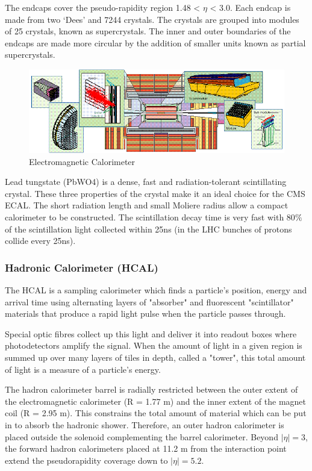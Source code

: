 The endcaps cover the pseudo-rapidity region 1.48 < $\eta$ < 3.0. Each endcap is made from two ‘Dees’ and 7244 crystals. The crystals are grouped into modules of 25 crystals, known as supercrystals. The inner and outer boundaries of the endcaps are made more circular by the addition of smaller units known as partial supercrystals.

\begin{figure}[H]
  \centering
\includegraphics[width=14cm]{CMS_chapter_plots/caloc}
  \caption{Electromagnetic Calorimeter \label{fig:caloc}}
\end{figure}
\noindent
Lead tungstate (PbWO4) is a dense, fast and radiation-tolerant scintillating crystal. These three properties of the crystal make it an ideal choice for the CMS ECAL. The short radiation length and small Moliere radius allow a compact calorimeter to be constructed. The scintillation decay time is very fast with 80$\%$ of the scintillation light collected within 25ns (in the LHC bunches of protons collide every 25ns). 

\subsubsection{Hadronic Calorimeter (HCAL)}

The HCAL \cite{HCAL} is a sampling calorimeter which finds a particle’s position, energy and arrival time using alternating	 layers of "absorber" and fluorescent "scintillator" materials that produce a rapid light pulse when the particle passes through.

Special optic fibres collect up this light and deliver it into readout boxes where photodetectors amplify the signal. When the amount of light in a given region is summed up over many layers of tiles in depth, called a "tower", this total amount of light is a measure of a particle’s energy. 

The hadron calorimeter barrel is radially restricted between the outer extent of the electromagnetic calorimeter (R = 1.77 m) and the inner extent of the magnet coil (R = 2.95 m). This constrains the total amount of material which can be put in to absorb the hadronic shower. Therefore, an outer hadron calorimeter is placed outside the solenoid complementing the barrel calorimeter. Beyond $|\eta| = 3$, the forward hadron calorimeters placed at 11.2 m from the interaction point extend the pseudorapidity coverage down to $|\eta| = 5.2$. 


